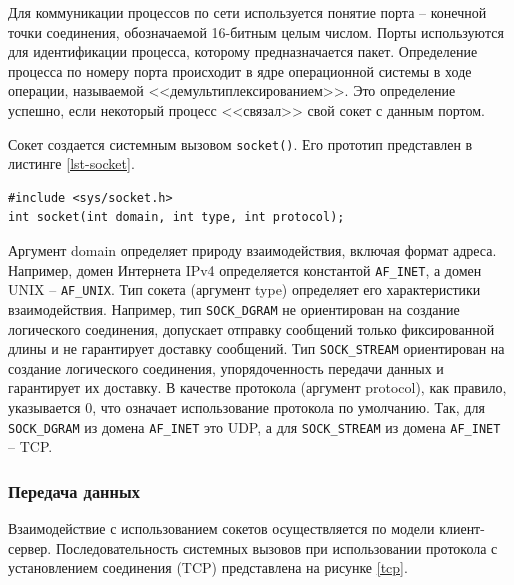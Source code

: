 Для коммуникации процессов по сети используется понятие порта -- конечной точки соединения, обозначаемой 16-битным целым числом. Порты используются для идентификации процесса, которому предназначается пакет. Определение процесса по номеру порта происходит в ядре операционной системы в ходе операции, называемой <<демультиплексированием>>. Это определение успешно, если некоторый процесс <<связал>> свой сокет с данным портом.

Сокет создается системным вызовом \texttt{socket()}. Его прототип представлен в листинге \ref{lst-socket}.

\captionsetup{singlelinecheck = false, justification=raggedright}
\begin{lstlisting}[caption={Прототип системного вызова socket()}, label=lst-socket]
#include <sys/socket.h>
int socket(int domain, int type, int protocol);
\end{lstlisting}
\captionsetup{singlelinecheck = false, justification=centering}

Аргумент domain определяет природу взаимодействия, включая формат адреса. Например, домен Интернета IPv4 определяется константой \texttt{AF\_INET}, а домен UNIX -- \texttt{AF\_UNIX}. Тип сокета (аргумент type) определяет его характеристики взаимодействия. Например, тип \texttt{SOCK\_DGRAM} не ориентирован на создание логического соединения, допускает отправку сообщений только фиксированной длины и не гарантирует доставку сообщений. Тип \texttt{SOCK\_STREAM} ориентирован на создание логического соединения, упорядоченность передачи данных и гарантирует их доставку. В качестве протокола (аргумент protocol), как правило, указывается 0, что означает использование протокола по умолчанию. Так, для \texttt{SOCK\_DGRAM} из домена \texttt{AF\_INET} это UDP, а для \texttt{SOCK\_STREAM} из домена \texttt{AF\_INET} -- TCP.

\subsubsection{Передача данных}

Взаимодействие с использованием сокетов осуществляется по модели клиент-сервер. Последовательность системных вызовов при использовании протокола с установлением соединения (TCP) представлена на рисунке \ref{tcp}.


